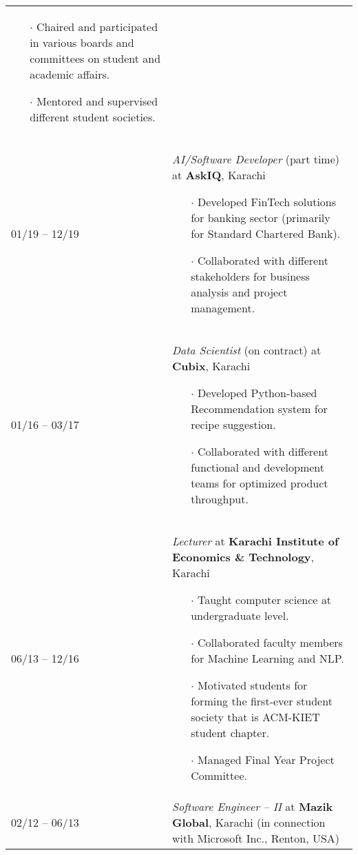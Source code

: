 \documentclass[10pt]{article}
\begin{document}
\begin{tabularx}{\textwidth}{lX}
\begin{itemize}
    \item[$\boldsymbol{\cdot}$] Chaired and participated in various boards and committees on student and academic affairs.
    \item[$\boldsymbol{\cdot}$] Mentored and supervised different student societies.
\end{itemize}
\\[-.5em]
01/19 – 12/19 & 
\emph{AI/Software Developer} (part time) at \textbf{AskIQ}, Karachi
\vspace{-.5em}
\begin{itemize}\itemsep=-.25em
    \item[$\boldsymbol{\cdot}$] Developed FinTech solutions for banking sector (primarily for Standard Chartered Bank).
    \item[$\boldsymbol{\cdot}$] Collaborated with different stakeholders for business analysis and project management.
\end{itemize}
\\[-.5em]
01/16 – 03/17 & 
\emph{Data Scientist} (on contract) at \textbf{Cubix}, Karachi
\vspace{-.5em}
\begin{itemize}\itemsep=-.25em
    \item[$\boldsymbol{\cdot}$] Developed Python-based Recommendation system for recipe suggestion.
    \item[$\boldsymbol{\cdot}$] Collaborated with different functional and development teams for optimized product throughput.
\end{itemize}
\\[-.5em]
06/13 – 12/16 & 
\emph{Lecturer} at \textbf{Karachi Institute of Economics \& Technology}, Karachi
\vspace{-.5em}
\begin{itemize}\itemsep=-.25em
    \item[$\boldsymbol{\cdot}$] Taught computer science at undergraduate level.
    \item[$\boldsymbol{\cdot}$] Collaborated faculty members for Machine Learning and NLP.
    \item[$\boldsymbol{\cdot}$] Motivated students for forming the first-ever student society that is ACM-KIET student chapter. 
    \item[$\boldsymbol{\cdot}$] Managed Final Year Project Committee.
\end{itemize}
\\[-.5em]
02/12 – 06/13 & 
\emph{Software Engineer -- II} at \textbf{Mazik Global}, Karachi (in connection with Microsoft Inc., Renton, USA)

\end{tabularx}
\end{document}

